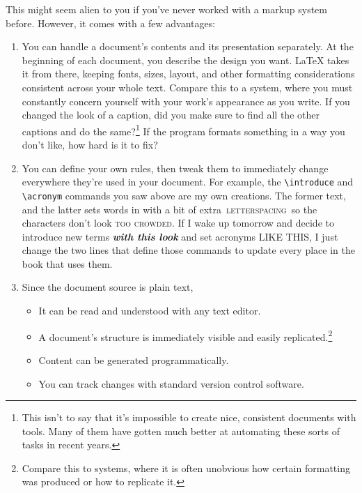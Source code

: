 This might seem alien to you if you've never worked with a markup system before.
However, it comes with a few advantages:
\begin{enumerate}
\item You can handle a document's contents and its presentation separately.
    At the beginning of each document,
    you describe the design you want.
    \LaTeX{} takes it from there,
    keeping fonts, sizes, layout,
    and other formatting considerations consistent across your
    whole text.
    Compare this to a  system,
    where you must constantly concern yourself with your work's appearance
    as you write.
    If you changed the look of a caption,
    did you make sure to find all the other captions and do the
    same?\footnote{This isn't to say that it's impossible
    to create nice, consistent documents with  tools.
    Many of them have gotten much better at automating these sorts of
    tasks in recent years.}
    If the program formats something in a way you don't like,
    how hard is it to fix?%

\item You can define your own rules, then tweak them to immediately change
    everywhere they're used in your document.
    For example, the \verb|\introduce| and \verb|\acronym| commands you saw above
    are my own creations. The former  text, and
    the latter sets words in  with a bit of extra
    \,\textsc{letterspacing}\, so the characters
    don't look \textsc{too crowded}.
    If I wake up tomorrow and decide to introduce new terms
    \textbf{\itshape with this look} and set acronyms
    {\small{} LIKE THIS},
    I just change the two lines that define those commands
    to update every place in the book that uses them.
\item Since the document source is plain text,
    \begin{itemize}
    \item It can be read and understood with any text editor.
    \item A document's structure is immediately visible
        and easily replicated.\punckern\footnote{Compare this to
         systems, where it is often unobvious
        how certain formatting was produced or how to replicate it.}
    \item Content can be generated programmatically.
    \item You can track changes with standard version control software.
    \end{itemize}
\end{enumerate}

